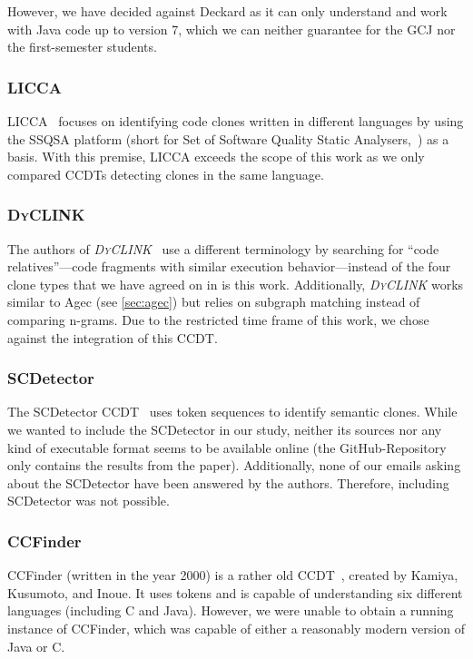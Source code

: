 \documentclass[10pt,journal,compsoc]{IEEEtran}
\begin{document}
However, we have decided against Deckard as it can only understand and work with Java code up to version 7, which we can neither guarantee for the GCJ nor the first-semester students.

\subsubsection{LICCA}
LICCA~\cite{vislavski2018licca} focuses on identifying code clones written in different languages by using the SSQSA platform (short for Set of Software Quality Static Analysers,~\cite{budimac2012ssqsa}) as a basis.
With this premise, LICCA exceeds the scope of this work as we only compared CCDTs detecting clones in the same language.

\subsubsection{D\textsc{y}CLINK}
The authors of \textsl{D\textsc{y}CLINK}~\cite{su2016code} use a different terminology by searching for \enquote{code relatives}---code fragments with similar execution behavior---instead of the four clone types that we have agreed on in is this work.
Additionally, \textsl{D\textsc{y}CLINK} works similar to Agec (see \cref{sec:agec}) but relies on subgraph matching instead of comparing n-grams.
Due to the restricted time frame of this work, we chose against the integration of this CCDT.

\subsubsection{SCDetector}
The SCDetector CCDT~\cite{wu2020scdetector} uses token sequences to identify semantic clones.
While we wanted to include the SCDetector in our study, neither its sources nor any kind of executable format seems to be available online (the GitHub-Repository only contains the results from the paper).
Additionally, none of our emails asking about the SCDetector have been answered by the authors.
Therefore, including SCDetector was not possible.

\subsubsection{CCFinder}
CCFinder (written in the year 2000) is a rather old CCDT~\cite{kamiya2002ccfinder}, created by Kamiya, Kusumoto, and Inoue.
It uses tokens and is capable of understanding six different languages (including C and Java).
However, we were unable to obtain a running instance of CCFinder, which was capable of either a reasonably modern version of Java or C.
\end{document}
